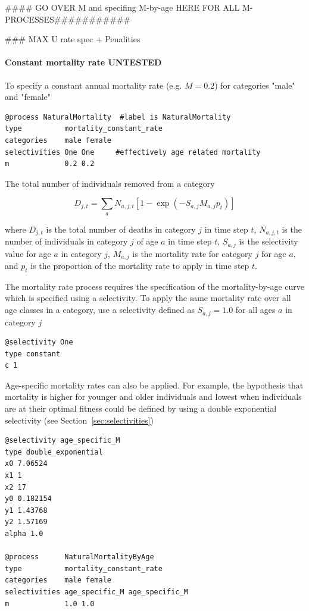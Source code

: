 #### GO OVER M and specifing M-by-age HERE FOR ALL M-PROCESSES###########

### MAX U rate spec + Penalities

\paragraph{Constant mortality rate UNTESTED}

To specify a constant annual mortality rate (e.g. $M=0.2$) for categories "male" and "female"

{\small{\begin{verbatim}
@process NaturalMortality  #label is NaturalMortality
type          mortality_constant_rate
categories    male female
selectivities One One     #effectively age related mortality 
m             0.2 0.2
\end{verbatim}}}

The total number of individuals removed from a category

\begin{equation}
D_{j,t} = \sum_a N_{a,j,t} [1 - \exp(-S_{a,j} M_{a,j} p_t)]
\end{equation}

where $D_{j,t}$ is the total number of deaths in category $j$ in time step $t$, $N_{a,j,t}$ is the number of individuals in category $j$ of age $a$ in time step $t$, $S_{a,j}$ is the selectivity value for age $a$ in category $j$, $M_{a,j}$ is the mortality rate for category $j$ for age $a$, and $p_t$ is the proportion of the mortality rate to apply in time step $t$.

The mortality rate process requires the specification of the mortality-by-age curve which is specified using a selectivity. To apply the same mortality rate over all age classes in a category, use a selectivity defined as $S_{a,j}=1.0$ for all ages $a$ in category $j$

{\small{\begin{verbatim}
@selectivity One
type constant
c 1
\end{verbatim}}}

Age-specific mortality rates can also be applied. For example, the hypothesis that mortality is higher for younger and older individuals and lowest when individuals are at their optimal fitness could be defined by using a double exponential selectivity (see Section~\ref{sec:selectivities})

{\small{\begin{verbatim}
@selectivity age_specific_M
type double_exponential
x0 7.06524
x1 1
x2 17
y0 0.182154
y1 1.43768
y2 1.57169
alpha 1.0

@process      NaturalMortalityByAge
type          mortality_constant_rate
categories    male female
selectivities age_specific_M age_specific_M
m             1.0 1.0
\end{verbatim}}}

